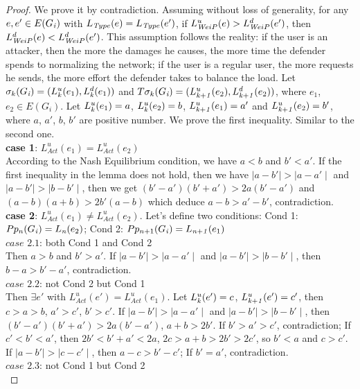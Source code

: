 \documentclass[10pt, conference, compsocconf]{IEEEtran}
\begin{document}
\begin{proof}
We prove it by contradiction. Assuming without loss of generality, for any $e,e'\in E(G_{\it i})$ with $L_{{\textit Type}}(e)=L_{{\textit Type}}(e')$, if $L_{{\textit WeiP}}^u(e)>L_{{\textit WeiP}}^d(e')$, then $L_{{\textit WeiP}}^d(e)<L_{{\textit WeiP}}^d(e')$. This assumption follows the reality: if the user is an attacker, then the more the damages he causes, the more time the defender spends to normalizing the network; if the user is a regular user, the more requests he sends, the more effort the defender takes to balance the load. Let $\sigma_{k}(G_{\textit{i}})=(L^u_{\it k}(e_{1}), L^d_{\it k}(e_{1}))$ and $T\sigma_{k}(G_{\textit{i}})=(L^u_{\it k+1}(e_{2}), L^d_{\it k+1}(e_{2}))$, where $e_1$, $e_2\in E(G_{\textit{i}})$.
Let $L^u_{\it k}(e_{1})=a$, $L^u_{\it k}(e_{2})=b$, $L^u_{\it k+1}(e_{1})=a'$ and $L^u_{\it k+1}(e_{2})=b'$, where $a$, $a'$, $b$, $b'$ are positive number. We prove the first inequality. Similar to the second one. \\
\textbf{case 1}: $L_{\textit{Act}}^u(e_{1})=L_{\textit{Act}}^u(e_{2})$\\
According to the Nash Equilibrium condition, we have $a<b$ and $b'<a'$. If the first inequality in the lemma does not hold, then we have $\mid a-b'\mid >\mid a-a'\mid$ and $\mid a-b' \mid>\mid b-b'\mid$, then we get $(b'-a')(b'+a')>2a(b'-a')$ and $(a-b)(a+b)>2b'(a-b)$ which deduce $a-b>a'-b'$, contradiction.\\
\textbf{case 2}: $L_{\textit{Act}}^u(e_{1})\neq L_{\textit{Act}}^u(e_{2})$.
Let's define two conditions:
Cond 1: $Pp_{n}(G_{\it i})=L_{\it n}(e_{2})$;
Cond 2: $Pp_{n+1}(G_{\it i})=L_{\it n+1}(e_{1})$\\
\textbf{$\textit{case 2.1}$}: both Cond 1 and Cond 2\\
Then $a>b$ and $b'>a'$. If $\mid a-b'\mid >\mid a-a'\mid$ and $\mid a-b' \mid>\mid b-b'\mid$, then $b-a>b'-a'$, contradiction. \\
\textbf{$\textit{case 2.2}$}: not Cond 2 but Cond 1 \\
Then $\exists e'$ with $L_{Act}^u(e')=L_{Act}^u(e_{1})$. Let $L_{\it k}^u(e')=c$, $L_{\it k+1}^u(e')=c'$, then $c>a>b$, $a'>c'$, $b'>c'$. If $\mid a-b'\mid >\mid a-a'\mid$ and $\mid a-b' \mid>\mid b-b'\mid$, then $(b'-a')(b'+a')>2a(b'-a')$, $a+b>2b'$. If $b'>a'>c'$, contradiction; If $c'<b'<a'$, then $2b'<b'+a'<2a$,  $2c>a+b>2b'>2c'$, so $b'<a$ and $c>c'$. If $\mid a-b' \mid>\mid c-c'\mid$, then $a-c>b'-c'$; If $b'=a'$, contradiction. \\
\textbf{$\textit{case 2.3}$}: not Cond 1 but Cond 2\\

\end{proof}
\end{document}
